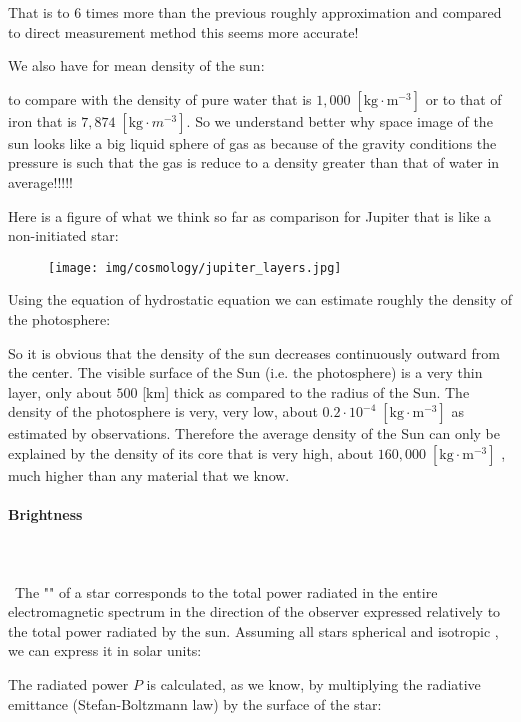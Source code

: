 	That is to $6$ times more than the previous roughly approximation and compared to direct measurement method this seems more accurate!
	
	We also have for mean density of the sun:
	
	to compare with the density of pure water that is $1,000 \; [\text{kg}\cdot \text{m}^{-3}]$ or to that of iron that is $7,874 \; [\text{kg}\cdot m^{-3}]$. So we understand better why space image of the sun looks like a big liquid sphere of gas as because of the gravity conditions the pressure is such that the gas is reduce to a density greater than that of water in average!!!!!
	
	Here is a figure of what we think so far as comparison for Jupiter that is like a non-initiated star:
	\begin{figure}[H]
		\centering
		\texttt{[image: img/cosmology/jupiter\_layers.jpg]}	
	\end{figure}
	
	Using the equation of hydrostatic equation we can estimate roughly the density of the photosphere:
	
	So it is obvious that the density of the sun decreases continuously outward from the center. The visible surface of the Sun (i.e. the photosphere) is a very thin layer, only about $500$ [km] thick as compared to the radius of the Sun. The density of the photosphere is very, very low, about $0.2\cdot 10^{-4} \;[\text{kg}\cdot \text{m}^{-3}]$ as estimated by observations. Therefore the average density of the Sun can only be explained by the density of its core that is very high, about $160,000\;[\text{kg}\cdot\text{m}^{-3}]$ , much higher than any material that we know.

	
	
	\pagebreak
	\paragraph{Brightness}\mbox{}\\\\\
	The "" of a star corresponds to the total power radiated in the entire electromagnetic spectrum in the direction of the observer expressed relatively to the total power radiated by the sun. Assuming all stars spherical and isotropic , we can express it in solar units:
	
	The radiated power $P$ is calculated, as we know, by multiplying the radiative emittance (Stefan-Boltzmann law) by the surface of the star:
	
